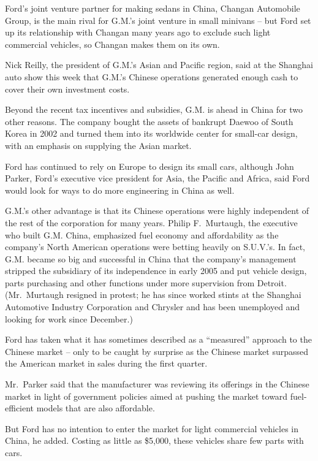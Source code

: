\documentclass[12pt,a4paper,onecolumn]{article}
\begin{document}
Ford's joint venture partner for making sedans in China, Changan Automobile Group, is the main rival
for G.M.'s joint venture in small minivans -- but Ford set up its relationship with Changan many
years ago to exclude such light commercial vehicles, so Changan makes them on its own.

Nick Reilly, the president of G.M.'s Asian and Pacific region, said at the Shanghai auto show this
week that G.M.'s Chinese operations generated enough cash to cover their own investment costs.

Beyond the recent tax incentives and subsidies, G.M. is ahead in China for two other reasons. The
company bought the assets of bankrupt Daewoo of South Korea in 2002 and turned them into its
worldwide center for small-car design, with an emphasis on supplying the Asian market.

Ford has continued to rely on Europe to design its small cars, although John Parker, Ford's
executive vice president for Asia, the Pacific and Africa, said Ford would look for ways to do more
engineering in China as well.

G.M.'s other advantage is that its Chinese operations were highly independent of the rest of the
corporation for many years. Philip F.~Murtaugh, the executive who built G.M. China, emphasized fuel
economy and affordability as the company's North American operations were betting heavily on
S.U.V.'s. In fact, G.M. became so big and successful in China that the company's management stripped
the subsidiary of its independence in early 2005 and put vehicle design, parts purchasing and other
functions under more supervision from Detroit. (Mr.~Murtaugh resigned in protest; he has since
worked stints at the Shanghai Automotive Industry Corporation and Chrysler and has been unemployed
and looking for work since December.)

Ford has taken what it has sometimes described as a ``measured'' approach to the Chinese market --
only to be caught by surprise as the Chinese market surpassed the American market in sales during
the first quarter.

Mr.~Parker said that the manufacturer was reviewing its offerings in the Chinese market in light of
government policies aimed at pushing the market toward fuel-efficient models that are also
affordable.

But Ford has no intention to enter the market for light commercial vehicles in China, he added.
Costing as little as \$5,000, these vehicles share few parts with cars.
\end{document}
